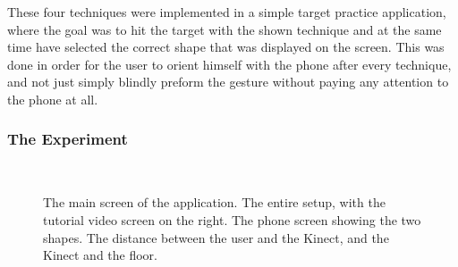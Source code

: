 These four techniques were implemented in a simple target practice application, where the goal was to hit the target with the shown technique and at the same time have selected the correct shape that was displayed on the screen. 
This was done in order for the user to orient himself with the phone after every technique, and not just simply blindly preform the gesture without paying any attention to the phone at all.  

\subsubsection{The Experiment}

\begin{figure}[H]
	\centering
	 \\
	\caption{
		\protect{} The main screen of the application.
		\protect{} The entire setup, with the tutorial video screen on the right.
		\protect{} The phone screen showing the two shapes.
		\protect{} The distance between the user and the Kinect, and the Kinect and the floor.
	}
	\label{fig:allSetup}
\end{figure}

